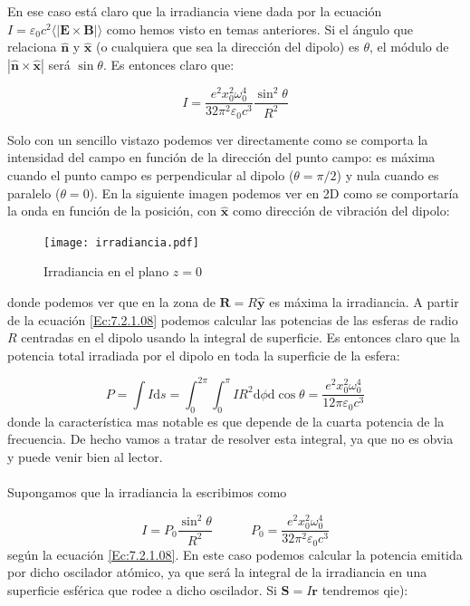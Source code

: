 \documentclass[12pt]{article}
\newcommand{\D}{\mathrm{d}}
\newcommand{\tquad}{\quad \quad \quad}
\newcommand{\Bn}{\mathbf{B}}
\newcommand{\En}{\mathbf{E}}
\newcommand{\rn}{\mathbf{r}}
\newcommand{\Sn}{\mathbf{S}}
\newcommand{\Rn}{\mathbf{R}}
\newcommand{\hnn}{\hat{\mathbf{n}}}
\newcommand{\hnx}{\hat{\mathbf{x}}}
\newcommand{\hny}{\hat{\mathbf{y}}}
\numberwithin{equation}{section}
\numberwithin{figure}{section}
\begin{document}
En ese caso está claro que la irradiancia viene dada por la ecuación $I = \varepsilon_0 c^2 \langle | \En \times \Bn | \rangle$ como hemos visto en  temas anteriores. Si el ángulo que relaciona $\hnn$ y $\hnx$ (o cualquiera que sea la dirección del dipolo) es $\theta$, el módulo de $|\hnn \times \hnx|$ será $\sin \theta$. Es entonces claro que:

\begin{equation}
I = \dfrac{e^2 x_0^2 \omega_0^4}{32 \pi^2 \varepsilon_0 c^3} \dfrac{\sin^2 \theta}{R^2} \label{Ec:7.2.1.08}
\end{equation}

Solo con un sencillo vistazo podemos ver directamente como se comporta la intensidad del campo en función de la dirección del punto campo: es máxima cuando el punto campo es  perpendicular al dipolo ($\theta = \pi /2$) y nula cuando es paralelo ($\theta = 0$). En la siguiente imagen podemos ver en 2D como se comportaría la onda en función de la posición, con $\hnx$ como dirección de vibración del dipolo:

\begin{figure}[h!] \centering
\texttt{[image: irradiancia.pdf]}
\caption{Irradiancia en el plano $z=0$}
\end{figure}
donde podemos ver que en la zona de $\Rn = R  \hny$ es máxima la irradiancia. A partir de la ecuación \ref{Ec:7.2.1.08} podemos calcular las potencias de las esferas de radio $R$ centradas en el dipolo usando la integral de superficie. Es entonces claro que la potencia total irradiada por el dipolo en toda la superficie de la esfera:

\begin{equation}
P = \int I \D s = \int_0^{2\pi} \int_{0}^\pi I R^2 \D \phi \D \cos \theta = \dfrac{e^2 x_0^2 \omega_0^4}{12 \pi \varepsilon_0 c^3} \label{Ec:7.2.1.09}
\end{equation}
donde la característica mas notable es que depende de la cuarta potencia de la frecuencia. De hecho vamos a tratar de resolver esta integral, ya que no es obvia y puede venir bien al lector. \\ 

\hrulefill \\
Supongamos que la irradiancia la escribimos como 

$$ I = P_0 \dfrac{\sin^2 \theta}{R^2} \tquad P_0 = \dfrac{e^2 x_0^2 \omega_0^4}{32 \pi^2 \varepsilon_0 c^3} $$
según la ecuación \ref{Ec:7.2.1.08}. En este caso podemos calcular la potencia emitida por dicho oscilador atómico, ya que será la integral de la irradiancia en una superficie esférica que rodee a dicho oscilador. Si $\Sn = I \rn$ tendremos qie):
\end{document}
